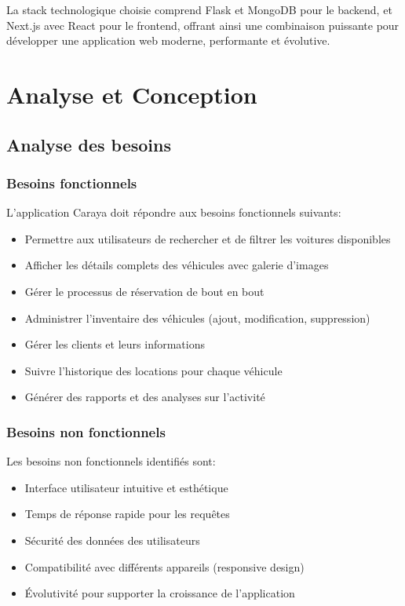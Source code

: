\documentclass[12pt,a4paper]{report}
\begin{document}
La stack technologique choisie comprend Flask et MongoDB pour le backend, et Next.js avec React pour le frontend, offrant ainsi une combinaison puissante pour développer une application web moderne, performante et évolutive.

\chapter{Analyse et Conception}
\section{Analyse des besoins}
\subsection{Besoins fonctionnels}
L'application Caraya doit répondre aux besoins fonctionnels suivants:
\begin{itemize}
    \item Permettre aux utilisateurs de rechercher et de filtrer les voitures disponibles
    \item Afficher les détails complets des véhicules avec galerie d'images
    \item Gérer le processus de réservation de bout en bout
    \item Administrer l'inventaire des véhicules (ajout, modification, suppression)
    \item Gérer les clients et leurs informations
    \item Suivre l'historique des locations pour chaque véhicule
    \item Générer des rapports et des analyses sur l'activité
\end{itemize}

\subsection{Besoins non fonctionnels}
Les besoins non fonctionnels identifiés sont:
\begin{itemize}
    \item Interface utilisateur intuitive et esthétique
    \item Temps de réponse rapide pour les requêtes
    \item Sécurité des données des utilisateurs
    \item Compatibilité avec différents appareils (responsive design)
    \item Évolutivité pour supporter la croissance de l'application
\end{itemize}
\end{document}
